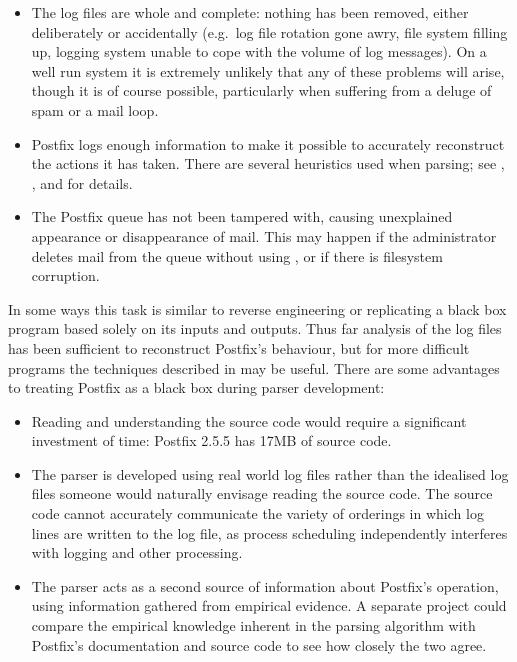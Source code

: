 \begin{itemize}

    \item The log files are whole and complete: nothing has been removed,
        either deliberately or accidentally (e.g.\ log file rotation gone
        awry, file system filling up, logging system unable to cope with
        the volume of log messages).  On a well run system it is extremely
        unlikely that any of these problems will arise, though it is of
        course possible, particularly when suffering from a deluge of spam
        or a mail loop.

    \item Postfix logs enough information to make it possible to accurately
        reconstruct the actions it has taken.  There are several heuristics
        used when parsing; see , , and
         for details.

    \item The Postfix queue has not been tampered with, causing unexplained
        appearance or disappearance of mail.  This may happen if the
        administrator deletes mail from the queue without using
        , or if there is filesystem corruption.

\end{itemize}

In some ways this task is similar to reverse engineering or replicating a
black box program based solely on its inputs and outputs.  Thus far
analysis of the log files has been sufficient to reconstruct Postfix's
behaviour, but for more difficult programs the techniques described in
\cite{black-box-error-reporting} may be useful.  There are some advantages
to treating Postfix as a black box during parser development:

\begin{itemize}

    \item Reading and understanding the source code would require a
        significant investment of time: Postfix 2.5.5 has 17MB of source
        code.

    \item The parser is developed using real world log files rather than
        the idealised log files someone would naturally envisage reading
        the source code.  The source code cannot accurately communicate the
        variety of orderings in which log lines are written to the log
        file, as process scheduling independently interferes with logging
        and other processing.

    \item The parser acts as a second source of information about Postfix's
        operation, using information gathered from empirical evidence.  A
        separate project could compare the empirical knowledge inherent in
        the parsing algorithm with Postfix's documentation and source code
        to see how closely the two agree.

\end{itemize}



